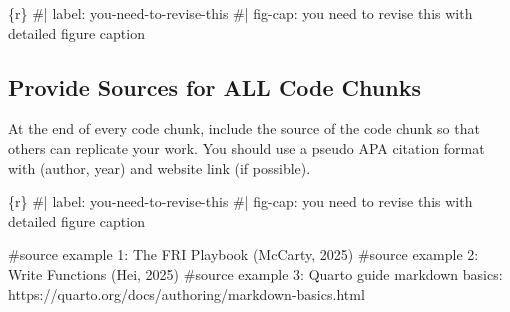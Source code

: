 \documentclass[
  english,
  letterpaper,
  DIV=11,
  numbers=noendperiod]{scrreprt}
\newenvironment{Shaded}{\begin{snugshade}}{\end{snugshade}}
\newcommand{\CommentTok}[1]{\textcolor[rgb]{0.37,0.37,0.37}{#1}}
\newcommand{\InformationTok}[1]{\textcolor[rgb]{0.37,0.37,0.37}{#1}}
\begin{document}
\begin{Shaded}
\begin{Highlighting}[]
\InformationTok{\textasciigrave{}\textasciigrave{}\textasciigrave{}\{r\}}
\CommentTok{\#| label: you{-}need{-}to{-}revise{-}this}
\CommentTok{\#| fig{-}cap: you need to revise this with detailed figure caption}

\InformationTok{\textasciigrave{}\textasciigrave{}\textasciigrave{}}
\end{Highlighting}
\end{Shaded}

\subsection{Provide Sources for ALL Code
Chunks}\label{provide-sources-for-all-code-chunks}

\begin{tcolorbox}[enhanced jigsaw, title=\textcolor{quarto-callout-important-color}{\faExclamation}\hspace{0.5em}{Requirement}, opacityback=0, colframe=quarto-callout-important-color-frame, rightrule=.15mm, left=2mm, toprule=.15mm, leftrule=.75mm, titlerule=0mm, bottomtitle=1mm, breakable, arc=.35mm, toptitle=1mm, bottomrule=.15mm, coltitle=black, opacitybacktitle=0.6, colback=white, colbacktitle=quarto-callout-important-color!10!white]

At the end of every code chunk, include the source of the code chunk so
that others can replicate your work. You should use a pseudo APA
citation format with (author, year) and website link (if possible).

\end{tcolorbox}

\begin{Shaded}
\begin{Highlighting}[]
\InformationTok{\textasciigrave{}\textasciigrave{}\textasciigrave{}\{r\}}
\CommentTok{\#| label: you{-}need{-}to{-}revise{-}this}
\CommentTok{\#| fig{-}cap: you need to revise this with detailed figure caption}

\CommentTok{\#source example 1: The FRI Playbook (McCarty, 2025)   }
\CommentTok{\#source example 2: Write Functions (Hei, 2025)   }
\CommentTok{\#source example 3: Quarto guide markdown basics: https://quarto.org/docs/authoring/markdown{-}basics.html}

\InformationTok{\textasciigrave{}\textasciigrave{}\textasciigrave{}}
\end{Highlighting}
\end{Shaded}
\end{document}

